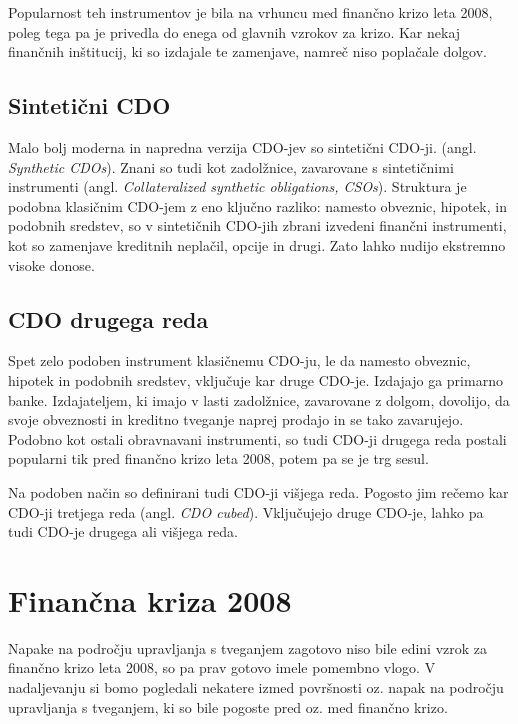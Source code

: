 \documentclass[12pt,a4paper]{amsart}
\theoremstyle{definition} %
\theoremstyle{plain} %
\begin{document}
Popularnost teh instrumentov je bila na vrhuncu med finančno krizo leta 2008, 
poleg tega pa je privedla do enega od glavnih vzrokov za krizo. Kar nekaj 
finančnih inštitucij, ki so izdajale te zamenjave, namreč niso poplačale dolgov.

\subsection{Sintetični CDO}
Malo bolj moderna in napredna verzija CDO-jev so sintetični CDO-ji. (angl. \textit{
Synthetic CDOs}). Znani so tudi kot zadolžnice, zavarovane s sintetičnimi instrumenti 
(angl. \textit{Collateralized synthetic obligations, CSOs}). Struktura je podobna 
klasičnim CDO-jem z eno ključno razliko: 
namesto obveznic, hipotek, in podobnih sredstev, so v sintetičnih CDO-jih zbrani 
izvedeni finančni instrumenti, kot so zamenjave kreditnih neplačil, opcije in drugi. 
Zato lahko nudijo ekstremno visoke donose.

\subsection{CDO drugega reda}
Spet zelo podoben instrument klasičnemu CDO-ju, le da namesto obveznic, 
hipotek in podobnih sredstev, vključuje kar druge CDO-je. Izdajajo ga primarno 
banke. Izdajateljem, ki imajo v lasti zadolžnice, zavarovane z dolgom, dovolijo, 
da svoje obveznosti in kreditno tveganje naprej prodajo in se tako zavarujejo. 
Podobno kot ostali obravnavani instrumenti, so tudi CDO-ji drugega reda postali 
popularni tik pred finančno krizo leta 2008, potem pa se je trg sesul.

Na podoben način so definirani tudi CDO-ji višjega reda. Pogosto jim rečemo 
kar CDO-ji tretjega reda (angl. \textit{CDO cubed}). Vključujejo druge CDO-je, 
lahko pa tudi CDO-je drugega ali višjega reda.



\section{Finančna kriza 2008}
\label{kriza}
Napake na področju upravljanja s tveganjem zagotovo niso bile edini vzrok za finančno 
krizo leta 2008, so pa prav gotovo imele pomembno vlogo. V nadaljevanju si bomo 
pogledali nekatere izmed površnosti oz. napak na področju upravljanja s tveganjem, 
ki so bile pogoste pred oz. med finančno krizo.
\end{document}
